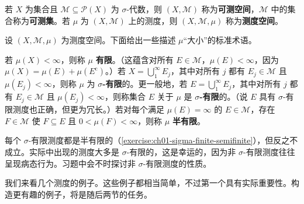 \documentclass[../../main.tex]{subfiles}%
\begin{document}

\begin{definition}[可测空间与测度空间]\label{definition:ch01-measure-space-definition}
若 $X$ 为集合且 $\mathscr{M}\subseteq\mathscr{P}(X)$ 为 $\sigma$-代数，则 $(X,\mathscr{M})$ 称为\textbf{可测空间}，$\mathscr{M}$ 中的集合称为\textbf{可测集}。若 $\mu$ 为 $(X,\mathscr{M})$ 上的测度，则 $(X,\mathscr{M},\mu)$ 称为\textbf{测度空间}。
\end{definition}


设 $(X,\mathscr{M},\mu)$ 为测度空间。下面给出一些描述 $\mu$“大小”的标准术语。
\begin{definition}\label{definition:ch01-finiteness-definitions}
若 $\mu(X)<\infty$，则称 $\mu$ \textbf{有限}。（这蕴含对所有 $E\in\mathscr{M}$，$\mu(E)<\infty$，因为 $\mu(X)=\mu(E)+\mu(E^{\mathrm{c}})$。）若 $X=\bigcup_1^\infty E_j$，其中对所有 $j$ 都有 $E_j\in\mathscr{M}$ 且 $\mu(E_j)<\infty$，则称 $\mu$ 为 \textbf{$\sigma$-有限}的。更一般地，若 $E=\bigcup_1^\infty E_j$，其中对所有 $j$ 都有 $E_j\in\mathscr{M}$ 且 $\mu(E_j)<\infty$，则称集合 $E$ 关于 $\mu$ 是 \textbf{$\sigma$-有限}的。（说 $E$ 具有 $\sigma$-有限测度也正确，但更为冗长。）若对每个满足 $\mu(E)=\infty$ 的 $E\in\mathscr{M}$，存在 $F\in\mathscr{M}$ 使 $F\subseteq E$ 且 $0<\mu(F)<\infty$，则称 $\mu$ \textbf{半有限}。
\end{definition}



\begin{remark}
每个 $\sigma$-有限测度都是半有限的（\cref{exercise:ch01-sigma-finite-semifinite}），但反之不成立。实际中出现的测度大多是 $\sigma$-有限的，这是幸运的，因为非 $\sigma$-有限测度往往呈现病态行为。习题中会不时探讨非 $\sigma$-有限测度的性质。
\end{remark}


我们来看几个测度的例子。这些例子都相当简单，不过第一个具有实际重要性。构造更有趣的例子，将是随后两节的任务。

\end{document}
